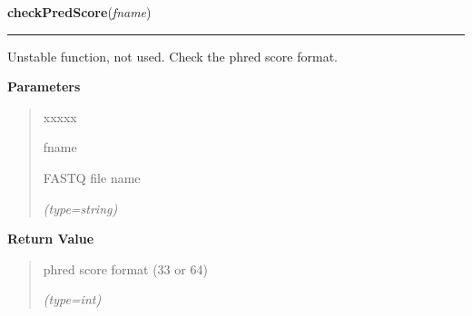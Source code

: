 \hspace{.8\funcindent}\begin{boxedminipage}{\funcwidth}

    \raggedright \textbf{checkPredScore}(\textit{fname})

    \vspace{-1.5ex}

    \rule{\textwidth}{0.5\fboxrule}
\setlength{\parskip}{2ex}
    Unstable function, not used. Check the phred score format.

\setlength{\parskip}{1ex}
      \textbf{Parameters}
      \vspace{-1ex}

      \begin{quote}
        \begin{Ventry}{xxxxx}

          \item[fname]

          FASTQ file name

            {\it (type=string)}

        \end{Ventry}

      \end{quote}

      \textbf{Return Value}
    \vspace{-1ex}

      \begin{quote}
      phred score format (33 or 64)

      {\it (type=int)}

      \end{quote}

    \end{boxedminipage}

    \label{script-BAMmaker:changePredScore}

    \vspace{0.5ex}


